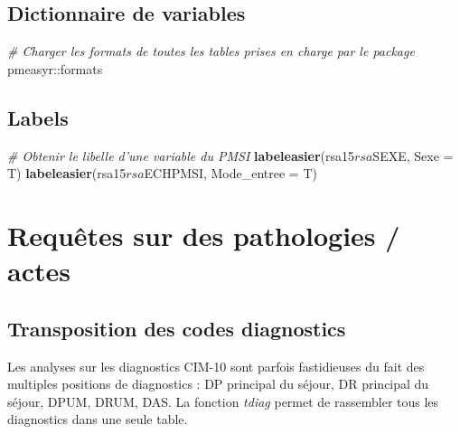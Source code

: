 \documentclass[]{book}
\newenvironment{Shaded}{\begin{snugshade}}{\end{snugshade}}
\newcommand{\KeywordTok}[1]{\textcolor[rgb]{0.13,0.29,0.53}{\textbf{{#1}}}}
\newcommand{\DataTypeTok}[1]{\textcolor[rgb]{0.13,0.29,0.53}{{#1}}}
\newcommand{\CommentTok}[1]{\textcolor[rgb]{0.56,0.35,0.01}{\textit{{#1}}}}
\newcommand{\NormalTok}[1]{{#1}}
\begin{document}
\section{Dictionnaire de variables}\label{dictionnaire-de-variables}

\begin{Shaded}
\end{Shaded}

\begin{Shaded}
\begin{Highlighting}[]
\CommentTok{# Charger les formats de toutes les tables prises en charge par le package}
\NormalTok{pmeasyr::formats}
\end{Highlighting}
\end{Shaded}

\section{Labels}\label{labels}

\begin{Shaded}
\begin{Highlighting}[]
\CommentTok{# Obtenir le libelle d'une variable du PMSI}
\KeywordTok{labeleasier}\NormalTok{(rsa15$rsa$SEXE, }\DataTypeTok{Sexe =} \NormalTok{T)}
\KeywordTok{labeleasier}\NormalTok{(rsa15$rsa$ECHPMSI, }\DataTypeTok{Mode_entree =} \NormalTok{T)}
\end{Highlighting}
\end{Shaded}

\chapter{Requêtes sur des pathologies /
actes}\label{requetes-sur-des-pathologies-actes}

\section{Transposition des codes
diagnostics}\label{transposition-des-codes-diagnostics}

Les analyses sur les diagnostics CIM-10 sont parfois fastidieuses du
fait des multiples positions de diagnostics : DP principal du séjour, DR
principal du séjour, DPUM, DRUM, DAS. La fonction \emph{tdiag} permet de
rassembler tous les diagnostics dans une seule table.
\end{document}
